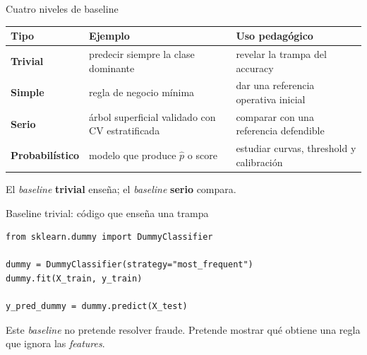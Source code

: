 \documentclass[aspectratio=169,12pt]{beamer}
\newcommand{\hrow}{\rowcolor{mlcream}}
\begin{document}
\begin{frame}{Cuatro niveles de baseline}
  \centering
  \begin{tabular}{@{}l L{0.35\textwidth} L{0.33\textwidth}@{}}
    \toprule
    \hrow \textbf{Tipo} & Ejemplo & Uso pedagógico \\
    \midrule
    \textbf{Trivial} & predecir siempre la clase dominante & revelar la trampa del accuracy \\
    \textbf{Simple} & regla de negocio mínima & dar una referencia operativa inicial \\
    \textbf{Serio} & árbol superficial validado con CV estratificada & comparar con una referencia defendible \\
    \textbf{Probabilístico} & modelo que produce $\hat{p}$ o score & estudiar curvas, threshold y calibración \\
    \bottomrule
  \end{tabular}
  \vspace{10pt}

  \raggedright\large El \emph{baseline} \textbf{trivial} enseña; el \emph{baseline} \textbf{serio} compara.
\end{frame}

\begin{frame}[fragile]{Baseline trivial: código que enseña una trampa}
\begin{lstlisting}[basicstyle=\ttfamily\footnotesize,columns=fullflexible,keepspaces=true]
from sklearn.dummy import DummyClassifier

dummy = DummyClassifier(strategy="most_frequent")
dummy.fit(X_train, y_train)

y_pred_dummy = dummy.predict(X_test)

\end{lstlisting}
  \begin{rulebox}
    Este \emph{baseline} no pretende resolver fraude. Pretende mostrar qué obtiene una regla que ignora las \emph{features}.
  \end{rulebox}
\end{frame}
\end{document}
